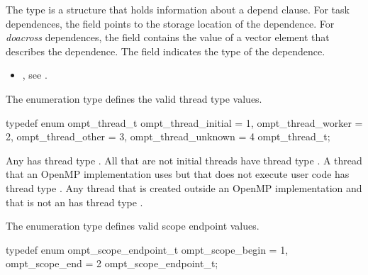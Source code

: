 \descr
The  type is a structure that holds information about 
a depend clause. For task dependences, the  field points to the 
storage location of the dependence. For \emph{doacross} dependences, the 
 field contains the value of a vector element that describes
the dependence. The  field indicates the type of the dependence.

\crossreferences
\begin{itemize}
\item {}, see
.
\end{itemize}



\label{sec:ompt_thread_t}

\summary
The  enumeration type defines the valid thread type values.

\format
\begin{ccppspecific}
\begin{omptEnum}
typedef enum ompt_thread_t {
  ompt_thread_initial                 = 1,
  ompt_thread_worker                  = 2,
  ompt_thread_other                   = 3,
  ompt_thread_unknown                 = 4
} ompt_thread_t;
\end{omptEnum}
\end{ccppspecific}

\descr
Any  has thread type .
All  that are not initial threads have thread
type . A thread that an OpenMP implementation 
uses but that does not execute user code has thread type .  
Any thread that is created outside an OpenMP implementation and that is not an 
 has thread type .



\label{sec:ompt_scope_endpoint_t}

\summary
The  enumeration type defines valid scope endpoint values.

\format
\begin{ccppspecific}
\begin{omptEnum}
typedef enum ompt_scope_endpoint_t {
  ompt_scope_begin                    = 1,
  ompt_scope_end                      = 2
} ompt_scope_endpoint_t;
\end{omptEnum}
\end{ccppspecific}



